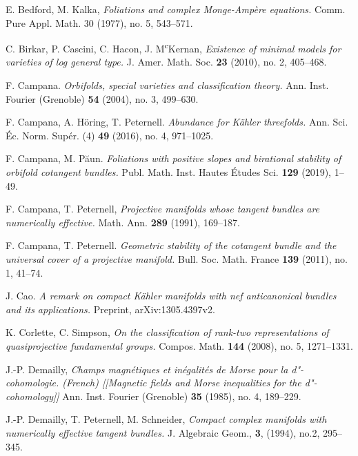 \documentclass[12pt]{amsart}
\theoremstyle{definition}
\theoremstyle{remark}
\begin{document}
\begin{thebibliography}{n}
\tiny

E. Bedford, M. Kalka,
\textit{Foliations and complex Monge-Amp\`ere equations.}
 Comm. Pure Appl. Math.  30  (1977),  no. 5, 543--571.
 

C. Birkar, P. Cascini, C. Hacon, J. M\textsuperscript cKernan,
\textit{Existence of minimal models for varieties of log general type.}
 J. Amer. Math. Soc.  {\bf{23}}  (2010),  no. 2, 405--468.
 
F. Campana. 
\textit{Orbifolds, special varieties and classification theory.} 
Ann. Inst. Fourier (Grenoble) {\bf{54}} (2004), no. 3, 499--630. 
  
 F. Campana, A. H\"oring, T. Peternell. 
\textit{Abundance for K\"ahler threefolds.}
Ann. Sci. \'Ec. Norm. Sup\'er. (4)  {\bf{49}}  (2016),  no. 4, 971--1025.


F. Campana, M. P\u{a}un. 
\textit{Foliations with positive slopes and birational stability of orbifold cotangent bundles.}
Publ. Math. Inst. Hautes \'Etudes Sci.
{\bf{129}}  (2019), 1--49.

F. Campana, T. Peternell, 
\textit{Projective manifolds whose tangent bundles are numerically effective.} 
Math. Ann. {\bf{289}} (1991), 169--187.

F. Campana, T. Peternell.
\textit{Geometric stability of the cotangent bundle and the universal cover of a projective manifold.}
Bull. Soc. Math. France  {\bf{139}}  (2011),  no. 1, 41--74.

 

J. Cao.
\textit{A remark on compact K\"ahler manifolds with nef anticanonical bundles and its applications.}
Preprint, arXiv:1305.4397v2.

K. Corlette, C. Simpson,
\textit{On the classification of rank-two representations of quasiprojective fundamental groups.}
 Compos. Math.  {\bf{144}}  (2008),  no. 5, 1271--1331.


J.-P. Demailly,
\textit{Champs magn\'etiques et in\'egalit\'es de Morse pour la d"-cohomologie.
(French)  [[Magnetic fields and Morse inequalities for the d"-cohomology]] }
Ann. Inst. Fourier (Grenoble)  {\bf{35}}  (1985),  no. 4, 189--229.


J.-P. Demailly, T. Peternell, M. Schneider, 
\textit{Compact complex manifolds with numerically effective tangent bundles.}
J. Algebraic Geom., {\bf{3}}, (1994), no.2, 295--345.


\end{thebibliography}
\end{document}
